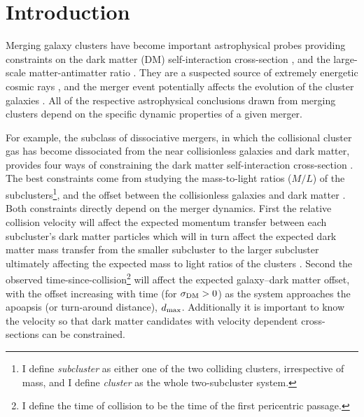 \documentclass[12pt]{emulateapj}
\begin{document}
\section{Introduction}\label{sec_intro}
Merging galaxy clusters have become important astrophysical probes providing constraints on the dark matter (DM) self-interaction cross-section \citep[$\sigma_{\rm DM}$;][]{Markevitch:2004dl, Randall:2008hs, Merten:2011gu, Dawson:2012dl}, and the large-scale matter-antimatter ratio \citep{Steigman:2008dy}.
They are a suspected source of extremely energetic cosmic rays \citep{vanWeeren:2010dn}, and the merger event potentially affects the evolution of the cluster galaxies \citep[e.g.][]{Poggianti:2004ca,Hwang:2009ip,Chung:2009bz}.
All of the respective astrophysical conclusions drawn from merging clusters depend on the specific dynamic properties of a given merger.


For example, the subclass of dissociative mergers, in which the collisional cluster gas has become dissociated from the near collisionless galaxies and dark matter,  provides four ways of constraining the dark matter self-interaction cross-section \citep{Markevitch:2004dl,Randall:2008hs}.
The best constraints come from studying the mass-to-light ratios ($M/L$) of the subclusters\footnote{I define \emph{subcluster} as either one of the two colliding clusters, irrespective of mass, and I define \emph{cluster} as the whole two-subcluster system.}, and the offset between the collisionless galaxies and dark matter \citep{Markevitch:2004dl,Randall:2008hs}.
Both constraints directly depend on the merger dynamics.
First the relative collision velocity will affect the expected momentum transfer between each subcluster's dark matter particles which will in turn affect the expected dark matter mass transfer from the smaller subcluster to the larger subcluster ultimately affecting the expected mass to light ratios of the clusters \citep{Markevitch:2004dl}.
Second the observed time-since-collision\footnote{I define the time of collision to be the time of the first pericentric passage.} will affect the expected galaxy--dark matter offset, with the offset increasing with time (for $\sigma_{\rm DM} > 0$) as the system approaches the apoapsis (or turn-around distance), $d_{\rm max}$.  
Additionally it is important to know the velocity so that dark matter candidates with velocity dependent cross-sections \citep[e.g.][]{Colin:2002ku,Vogelsberger:2012dy} can be constrained.
\end{document}
